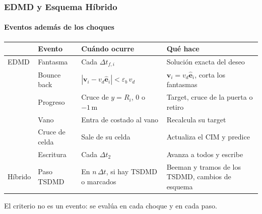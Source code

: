 \documentclass[11pt,aspectratio=169]{beamer}
\newcommand{\vect}[1]{\mathbf{#1}}          %
\newcommand{\un}[1]{\,\mathrm{#1}}          %
\newcommand{\dt}{\Delta t}
\newcommand{\vd}{v_d}
\newcommand{\ed}{\hat{\vect{e}}}
\newcommand{\dtf}[1][]{\Delta t_{f#1}}
\newcommand{\epsb}{\varepsilon_b}
\begin{document}
\begin{frame}
  \frametitle{EDMD y Esquema Híbrido}
  \framesubtitle{Eventos además de los choques}

  \vfill
  \begin{center}
    \scriptsize
    \renewcommand{\arraystretch}{1.3}
    \begin{tabular}{@{}l l p{} p{}@{}}
      \toprule
      & \textbf{Evento} & \textbf{Cuándo ocurre} & \textbf{Qué hace}\\
      \midrule
      EDMD & Fantasma & Cada $\dtf[,i]$ & Solución exacta del deseo\\
           & Bounce back & $|\vect{v}_i-\vd\ed_i|<\epsb\,\vd$ & $\vect{v}_i=\vd\ed_i$, corta los fantasmas\\
           & Progreso & Cruce de $y=R_i$, $0$ o $-1\un{m}$ & Target, cruce de la puerta o retiro\\
           & Vano & Entra de costado al vano & Recalcula su target\\
           & Cruce de celda & Sale de su celda & Actualiza el CIM y predice\\
           & Escritura & Cada $\dt_2$ & Avanza a todos y escribe\\
      \midrule
      Híbrido & Paso TSDMD & En $n\,\dt$, si hay TSDMD o marcados & Beeman y tramos de los TSDMD, cambios de esquema\\
      \bottomrule
    \end{tabular}

    \vspace{0.6em}
    {\scriptsize El criterio no es un evento: se evalúa en cada choque y en cada paso.}
  \end{center}
  \vfill
\end{frame}
\end{document}
